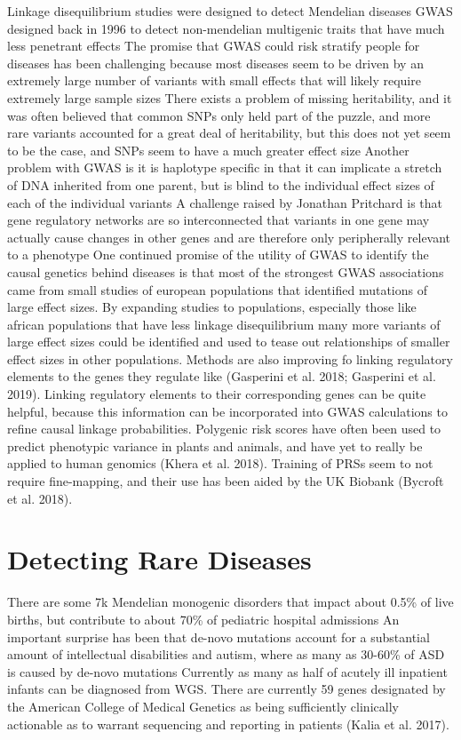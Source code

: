 \documentclass[]{book}
\begin{document}
Linkage disequilibrium studies were designed to detect Mendelian
diseases GWAS designed back in 1996 to detect non-mendelian multigenic
traits that have much less penetrant effects The promise that GWAS could
risk stratify people for diseases has been challenging because most
diseases seem to be driven by an extremely large number of variants with
small effects that will likely require extremely large sample sizes
There exists a problem of missing heritability, and it was often
believed that common SNPs only held part of the puzzle, and more rare
variants accounted for a great deal of heritability, but this does not
yet seem to be the case, and SNPs seem to have a much greater effect
size Another problem with GWAS is it is haplotype specific in that it
can implicate a stretch of DNA inherited from one parent, but is blind
to the individual effect sizes of each of the individual variants A
challenge raised by Jonathan Pritchard is that gene regulatory networks
are so interconnected that variants in one gene may actually cause
changes in other genes and are therefore only peripherally relevant to a
phenotype One continued promise of the utility of GWAS to identify the
causal genetics behind diseases is that most of the strongest GWAS
associations came from small studies of european populations that
identified mutations of large effect sizes. By expanding studies to
populations, especially those like african populations that have less
linkage disequilibrium many more variants of large effect sizes could be
identified and used to tease out relationships of smaller effect sizes
in other populations. Methods are also improving fo linking regulatory
elements to the genes they regulate like (Gasperini et al. 2018;
Gasperini et al. 2019). Linking regulatory elements to their
corresponding genes can be quite helpful, because this information can
be incorporated into GWAS calculations to refine causal linkage
probabilities. Polygenic risk scores have often been used to predict
phenotypic variance in plants and animals, and have yet to really be
applied to human genomics (Khera et al. 2018). Training of PRSs seem to
not require fine-mapping, and their use has been aided by the UK Biobank
(Bycroft et al. 2018).

\section{Detecting Rare Diseases}\label{detecting-rare-diseases}

There are some 7k Mendelian monogenic disorders that impact about 0.5\%
of live births, but contribute to about 70\% of pediatric hospital
admissions An important surprise has been that de-novo mutations account
for a substantial amount of intellectual disabilities and autism, where
as many as 30-60\% of ASD is caused by de-novo mutations Currently as
many as half of acutely ill inpatient infants can be diagnosed from WGS.
There are currently 59 genes designated by the American College of
Medical Genetics as being sufficiently clinically actionable as to
warrant sequencing and reporting in patients (Kalia et al. 2017).
\end{document}
